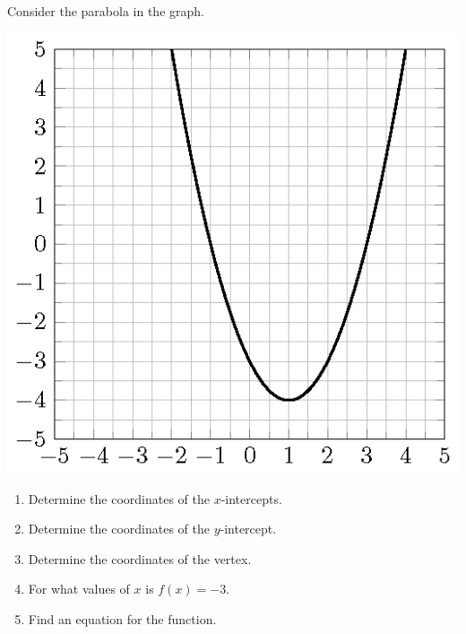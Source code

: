 \begin{exercise}

Consider the parabola in the graph.

\includegraphics{figs/tikz-exercise-graph-quadratic-1.png}

\begin{enumerate}
\item
  Determine the coordinates of the \(x\)-intercepts.
\item
  Determine the coordinates of the \(y\)-intercept.
\item
  Determine the coordinates of the vertex.
\item
  For what values of \(x\) is \(f(x)=-3\).
\item
  Find an equation for the function.
\end{enumerate}

\end{exercise}

